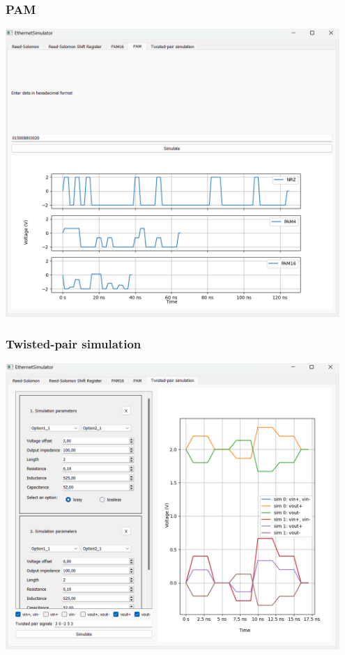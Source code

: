 \documentclass{beamer}
\begin{document}
\begin{frame}
\frametitle{PAM}
\includegraphics[width=0.95\textwidth]{images/prezentacja_pam.png}
\end{frame}

\begin{frame}
\frametitle{Twisted-pair simulation}
\includegraphics[width=0.95\textwidth]{images/prezentacja_tp.png}
\end{frame}
\end{document}
